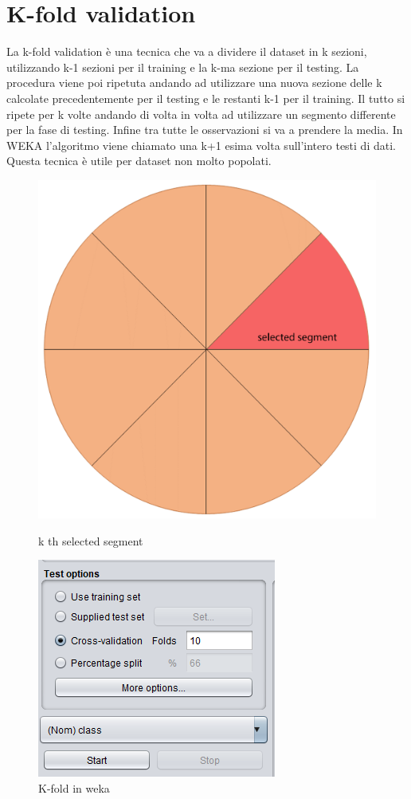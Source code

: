 \section{K-fold validation}
\label{par:kfold}
La k-fold validation è una tecnica che va a dividere il dataset in k sezioni, utilizzando k-1 sezioni per il training e la k-ma sezione per il testing. La procedura viene poi ripetuta andando ad utilizzare una nuova sezione delle k calcolate precedentemente per il testing e le restanti k-1 per il training. Il tutto si ripete per k volte andando di volta in volta ad utilizzare un segmento differente per la fase di testing. Infine tra tutte le osservazioni si va a prendere la media. In WEKA l'algoritmo viene chiamato una k+1 esima volta sull'intero testi di dati\cite{kcross}. Questa tecnica è utile per dataset non molto popolati.  
\begin{figure}[h]
   \begin{minipage}{0.48\textwidth}
     \centering
     \includegraphics[width=0.60\linewidth]{imgs/capitolo4/kfold1.png}
     \caption{k th selected segment}
         \label{fig:cross}
   \end{minipage}\hfill
   \begin{minipage}{0.48\textwidth}
     \centering
     \includegraphics[width=0.60\linewidth]{imgs/capitolo4/weka_kcross.png}
     \caption{K-fold in weka}
     \label{fig:wekacross}
   \end{minipage}
\end{figure}

